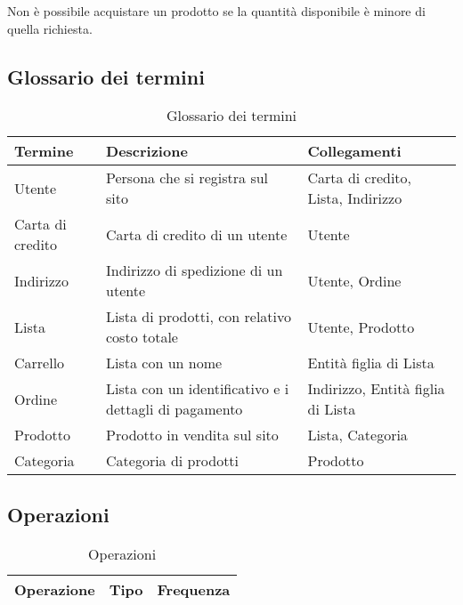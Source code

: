 \documentclass[11pt]{article}
\begin{document}
Non è possibile acquistare un prodotto se la quantità disponibile è minore di
quella richiesta. 

\subsection{Glossario dei termini}

\begin{table}[ht]
	\centering
	\begin{tabular}{|l|l|l|}
		\hline
		\textbf{Termine} & \textbf{Descrizione} & \textbf{Collegamenti} \\
		\hline
		Utente & Persona che si registra sul sito & Carta di credito,
		Lista, Indirizzo \\
		\hline
		Carta di credito & Carta di credito di un utente & Utente \\
		\hline
		Indirizzo & Indirizzo di spedizione di un utente & Utente,
		Ordine \\
		\hline
		Lista & Lista di prodotti, con relativo costo totale & Utente,
		Prodotto \\
		\hline
		Carrello & Lista con un nome & Entità figlia di Lista \\
		\hline
		Ordine & Lista con un identificativo e i dettagli di pagamento
		& Indirizzo, Entità figlia di Lista \\
		\hline
		Prodotto & Prodotto in vendita sul sito & Lista, Categoria \\
		\hline
		Categoria & Categoria di prodotti & Prodotto \\
		\hline
	\end{tabular}
	\caption{Glossario dei termini}
\end{table}

\subsection{Operazioni}

\begin{table}[ht]
	\centering
	\begin{tabular}{|l|l|l|}
		\hline
		\textbf{Operazione} & \textbf{Tipo} & \textbf{Frequenza} \\
		\hline
	\end{tabular}
	\caption{Operazioni}
\end{table}
\end{document}

